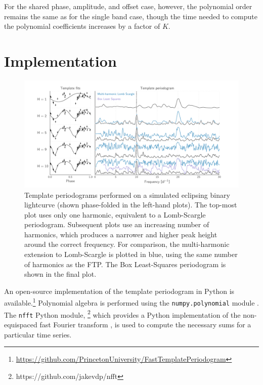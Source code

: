 \documentclass[apj]{emulateapj}
\begin{document}
For the shared phase, amplitude, and offset case, however, the polynomial
order remains the same as for the single band case, though the time needed to compute
the polynomial coefficients increases by a factor of $K$. 

\section{Implementation}\label{sec:implementation}

\begin{figure}
    \centering
    \includegraphics[width=\textwidth]{plots/templates_and_periodograms.pdf}
    \caption{\label{fig:tempsandpdgs} Template periodograms performed on a simulated eclipsing
            binary lightcurve (shown phase-folded in the left-hand plots). The top-most plot 
            uses only one harmonic, equivalent to a Lomb-Scargle periodogram. Subsequent plots
            use an increasing number of harmonics, which produces a narrower and higher peak
            height around the correct frequency. For comparison, the multi-harmonic extension 
            to Lomb-Scargle is plotted in blue, using the same number of harmonics as the FTP.
            The Box Least-Squares \citep{Kovacs_2002} periodogram is shown in the final plot.}
\end{figure}

An open-source implementation of the template periodogram in Python is
available.\footnote{\url{https://github.com/PrincetonUniversity/FastTemplatePeriodogram}} 
Polynomial algebra is performed using the \texttt{numpy.polynomial} module 
\citep{Scipy}. The \texttt{nfft} Python module,
\footnote{https://github.com/jakevdp/nfft} which provides a Python 
implementation of the non-equispaced fast Fourier transform \citep{NFFT}, 
is used to compute the necessary sums for a particular time series.
\end{document}
